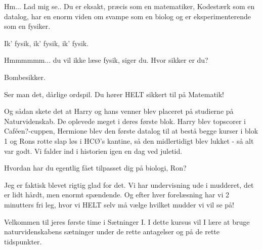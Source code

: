 \documentclass[a4paper,11pt]{article}
\begin{document}
\begin{sketch}
 Hm... Lad mig se.. Du er eksakt, præcis som en matematiker, Kodestærk som en datalog, har en enorm viden om svampe som en biolog og er eksperimenterende som en fysiker.

 Ik' fysik, ik' fysik, ik' fysik.

 Hmmmmmm... du vil ikke læse fysik, siger du. Hvor sikker er du?

 Bombesikker.

 Ser man det, dårlige ordspil. Du hører HELT sikkert til på Matematik!


 Og sådan skete det at Harry og hans venner blev placeret på studierne på Naturvidenskab. De oplevede meget i deres første blok. Harry blev topscorer i Caféen?-cuppen, Hermione blev den første datalog til at bestå begge kurser i blok 1 og Rons rotte slap løs i HCØ's kantine, så den midlertidigt blev lukket - så alt var godt. Vi falder ind i historien igen en dag ved juletid.



 Hvordan har du egentlig fået tilpasset dig på biologi, Ron?

 Jeg er faktisk blevet rigtig glad for det. Vi har undervisning ude i mudderet, det er lidt hårdt, men enormt spændende. Og efter hver forelæsning har vi 2 minutters fri leg, hvor vi HELT selv må vælge hvilket mudder vi vil se på!


 Velkommen til jeres første time i Sætninger I. I dette kursus vil I lære at bruge naturvidenskabens sætninger under de rette antagelser og på de rette tidspunkter.


\end{sketch}
\end{document}
